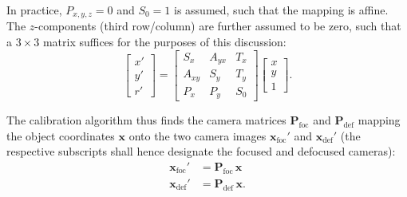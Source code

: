 \documentclass[11.5pt,oneside]{book}
\begin{document}
In practice, $P_{x,y,z} = 0$ and $S_0 = 1$ is assumed, such that the mapping is
affine. The $z$-components (third row/column) are further assumed to be zero,
such that a $3 \times 3$ matrix suffices for the purposes of this discussion:
\begin{equation}
\left[\begin{array}{c} x'\\ y'\\ r' \end{array} \right]
=
\left[ \begin{array}{ccc}
S_x & A_{yx} &  T_x \\
A_{xy} & S_y &  T_y \\
P_x & P_y & S_0
\end{array} \right]
\left[ \begin{array}{c} x\\ y \\ 1 \end{array} \right].
\end{equation}

The calibration algorithm thus finds the camera matrices
$\mathbf{P}_\text{foc}$ and $\mathbf{P}_\text{def}$ mapping the
object coordinates $\mathbf{x}$ onto the two camera images
$\mathbf{x}_\text{foc}'$ and $\mathbf{x}_\text{def}'$ (the respective 
    subscripts shall hence designate the focused and defocused
    cameras):
\begin{align}
    \mathbf{x}_\text{foc}' &= \mathbf{P}_\text{foc} \, \mathbf{x} \\
    \mathbf{x}_\text{def}' &= \mathbf{P}_\text{def} \, \mathbf{x}.
\end{align}
\end{document}
